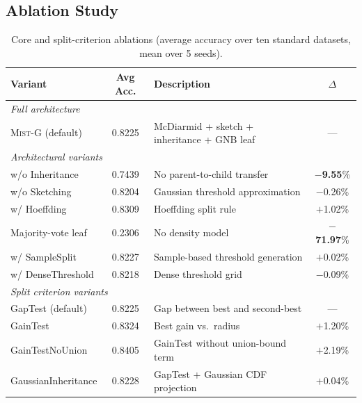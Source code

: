\documentclass{article}
\newcommand{\mist}{\textsc{Mist}}
\begin{document}
\subsection{Ablation Study}
\begin{table}[h]
\caption{Core and split-criterion ablations (average accuracy over 
ten standard datasets, mean over 5 seeds).}
\label{tab:ablation-core}
\centering
\small
\setlength{\tabcolsep}{3pt}
\begin{tabular}{lclc}
\toprule
Variant & Avg Acc. & Description & $\Delta$ \\
\midrule
\multicolumn{4}{l}{\textit{Full architecture}} \\
\mist{}-G (default) & 0.8225 & McDiarmid + sketch + inheritance + GNB leaf & --- \\
\midrule
\multicolumn{4}{l}{\textit{Architectural variants}} \\
w/o Inheritance    & 0.7439 & No parent-to-child transfer         & $-$\textbf{9.55}\%  \\
w/o Sketching      & 0.8204 & Gaussian threshold approximation    & $-$0.26\%  \\
w/ Hoeffding       & 0.8309 & Hoeffding split rule                & $+$1.02\%  \\
Majority-vote leaf & 0.2306 & No density model                    & $-$\textbf{71.97}\% \\
w/ SampleSplit     & 0.8227 & Sample-based threshold generation   & $+$0.02\%  \\
w/ DenseThreshold  & 0.8218 & Dense threshold grid                & $-$0.09\%  \\
\midrule
\multicolumn{4}{l}{\textit{Split criterion variants}} \\
GapTest (default)    & 0.8225 & Gap between best and second-best   & ---        \\
GainTest             & 0.8324 & Best gain vs.\ radius              & $+$1.20\%  \\
GainTestNoUnion      & 0.8405 & GainTest without union-bound term  & $+$2.19\%  \\
GaussianInheritance  & 0.8228 & GapTest + Gaussian CDF projection  & $+$0.04\%  \\
\bottomrule
\end{tabular}
\end{table}
\end{document}
